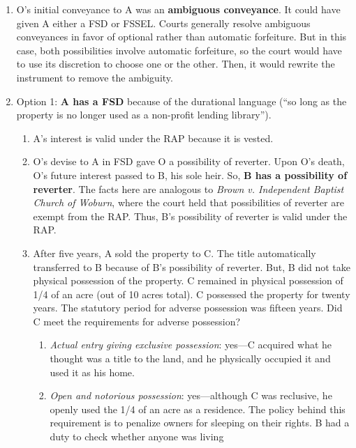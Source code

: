 \begin{enumerate}
    \item O's initial conveyance to A was an \textbf{ambiguous conveyance}. It 
    could have given A either a FSD or FSSEL. Courts generally resolve 
    ambiguous conveyances in favor of optional rather than automatic 
    forfeiture. But in this case, both possibilities involve automatic 
    forfeiture, so the court would have to use its discretion to choose one or 
    the other. Then, it would rewrite the instrument to remove the ambiguity.
    \item Option 1: \textbf{A has a FSD} because of the durational language 
    (``so long as the property is no longer used as a non-profit lending 
    library'').
    \begin{enumerate}
        \item A's interest is valid under the RAP because it is vested.
        \item O's devise to A in FSD gave O a possibility of reverter. Upon 
        O's death, O's future interest passed to B, his sole heir. So, 
        \textbf{B has a possibility of reverter}. The facts here are analogous 
        to \emph{Brown v. Independent Baptist Church of Woburn}, where the 
        court held that possibilities of reverter are exempt from the RAP. 
        Thus, B's possibility of reverter is valid under the RAP.
        \item After five years, A sold the property to C. The title 
        automatically transferred to B because of B's possibility of reverter. 
        But, B did not take physical possession of the property. C remained in 
        physical possession of 1/4 of an acre (out of 10 acres total). C 
        possessed the property for twenty years. The statutory period for 
        adverse possession was fifteen years. Did C meet the requirements for 
        adverse possession?
        \begin{enumerate}
            \item \emph{Actual entry giving exclusive possession}: yes---C 
            acquired what he thought was a title to the land, and he 
            physically occupied it and used it as his home.
            \item \emph{Open and notorious possession}: yes---although C was 
            reclusive, he openly used the 1/4 of an acre as a residence. The 
            policy behind this requirement is to penalize owners for sleeping 
            on their rights. B had a duty to check whether anyone was living 

\end{enumerate}
\end{enumerate}
\end{enumerate}
